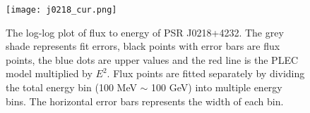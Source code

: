 \documentclass[a4paper, 12pt]{report}
\begin{document}
      \begin{table}[!htp]
        \centering
          \caption[Fit parameters of the spectra model of PSR J0218+4232.]
            {Fit parameters of the spectra model of PSR J0218+4232. 
            The names of parameters are consistent with Equation
            \ref{eq: fermi_model}. The previous results are reported by
            \citet{0067-0049-208-2-17}}
          \label{table: j0218_fit_result}        
      \end{table}  

      \begin{figure}[!htp]
        \centering 
        \texttt{[image: j0218\_cur.png]}
        \caption[The log-log plot of flux to energy of PSR J0218+4232.]
        {The log-log plot of flux to energy of PSR J0218+4232. The grey shade represents 
        fit errors, black points with error bars are flux points, the blue dots are upper values and the 
        red line is the PLEC model multiplied by $E^2$. Flux points 
        are fitted separately by dividing the total energy bin (100 MeV $\sim$ 100 GeV) into multiple energy bins.
        The horizontal error bars represents the width of each bin.}
        \label{fig: j0218_cur.png}
      \end{figure}
        
\end{document}
